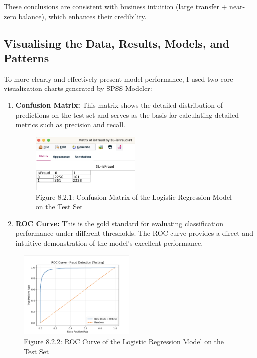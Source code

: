 \documentclass[sigplan,screen]{acmart}
\begin{document}
These conclusions are consistent with business intuition (large transfer + near-zero balance), which enhances their credibility.

\subsection{Visualising the Data, Results, Models, and Patterns}

To more clearly and effectively present model performance, I used two core visualization charts generated by SPSS Modeler:

\begin{enumerate}
    \item \textbf{Confusion Matrix:} This matrix shows the detailed distribution of predictions on the test set and serves as the basis for calculating detailed metrics such as precision and recall.
    
    \begin{figure}[H]
        \centering
        \includegraphics[width=0.5\textwidth]{8.2.1.png}
        \caption*{Figure 8.2.1: Confusion Matrix of the Logistic Regression Model on the Test Set}
        \label{fig:8.2.1}
    \end{figure}
    
    \item \textbf{ROC Curve:} This is the gold standard for evaluating classification performance under different thresholds. The ROC curve provides a direct and intuitive demonstration of the model's excellent performance.
\end{enumerate}

\begin{figure}[H]
    \centering
    \includegraphics[width=0.5\textwidth]{8.2.2.png}
    \caption*{Figure 8.2.2: ROC Curve of the Logistic Regression Model on the Test Set}
    \label{fig:8.2.2}
\end{figure}
\end{document}
